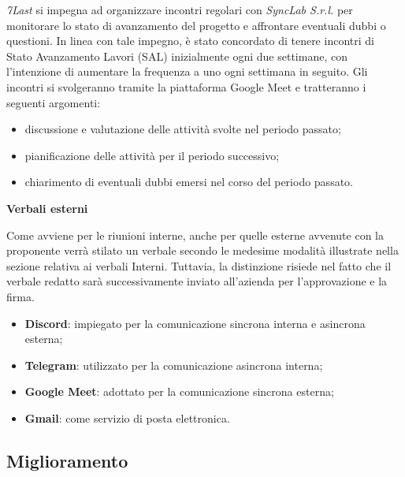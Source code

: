 \textit{7Last} si impegna ad organizzare incontri regolari con \textit{SyncLab S.r.l.} per monitorare lo stato di avanzamento del progetto e affrontare eventuali dubbi o questioni. In linea con tale impegno, è stato concordato di tenere incontri di Stato Avanzamento Lavori (SAL) inizialmente ogni due settimane, con l'intenzione di aumentare la frequenza a uno ogni settimana in seguito. Gli incontri si svolgeranno tramite la piattaforma Google Meet e tratteranno i seguenti argomenti:
\begin{itemize}
    \item discussione e valutazione delle attività svolte nel periodo passato;
    \item pianificazione delle attività per il periodo successivo;
    \item chiarimento di eventuali dubbi emersi nel corso del periodo passato.
\end{itemize}
\begin{flushleft}
\textbf{Verbali esterni}
\end{flushleft}
Come avviene per le riunioni interne, anche per quelle esterne avvenute con la proponente verrà stilato un verbale secondo le medesime modalità illustrate nella sezione relativa ai verbali Interni. Tuttavia, la distinzione risiede nel fatto che il verbale redatto sarà successivamente inviato all'azienda per l'approvazione e la firma.

\begin{itemize}
    \item \textbf{Discord}: impiegato per la comunicazione sincrona interna e asincrona esterna;
    \item \textbf{Telegram}: utilizzato per la comunicazione asincrona interna;
    \item \textbf{Google Meet}: adottato per la comunicazione sincrona esterna;
    \item \textbf{Gmail}: come servizio di posta elettronica.
\end{itemize}

\subsection{Miglioramento}
